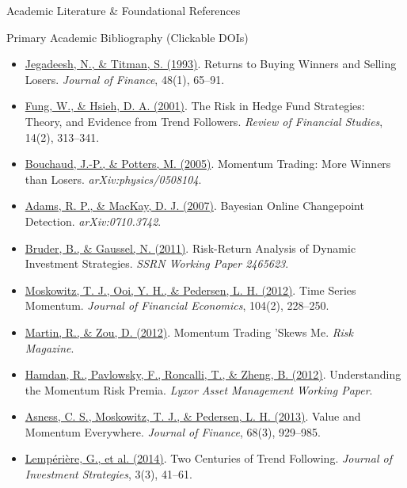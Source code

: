 \documentclass[10pt]{beamer}
\begin{document}
\begin{frame}{Academic Literature \& Foundational References}
  \begin{block}{\tiny Primary Academic Bibliography (Clickable DOIs)}
    \begin{itemize}\tiny
      \item \href{https://doi.org/10.1111/j.1540-6261.1993.tb04702.x}{Jegadeesh, N., \& Titman, S. (1993)}. Returns to Buying Winners and Selling Losers. \emph{Journal of Finance}, 48(1), 65--91.
      \item \href{https://people.duke.edu/~dah7/RFS2001.pdf}{Fung, W., \& Hsieh, D. A. (2001)}. The Risk in Hedge Fund Strategies: Theory, and Evidence from Trend Followers. \emph{Review of Financial Studies}, 14(2), 313--341.
      \item \href{https://arxiv.org/abs/physics/0508104}{Bouchaud, J.-P., \& Potters, M. (2005)}. Momentum Trading: More Winners than Losers. \emph{arXiv:physics/0508104}.
      \item \href{https://arxiv.org/abs/0710.3742}{Adams, R. P., \& MacKay, D. J. (2007)}. Bayesian Online Changepoint Detection. \emph{arXiv:0710.3742}.
      \item \href{https://ssrn.com/abstract=2465623}{Bruder, B., \& Gaussel, N. (2011)}. Risk-Return Analysis of Dynamic Investment Strategies. \emph{SSRN Working Paper 2465623}.
      \item \href{https://doi.org/10.1016/j.jfineco.2011.11.003}{Moskowitz, T. J., Ooi, Y. H., \& Pedersen, L. H. (2012)}. Time Series Momentum. \emph{Journal of Financial Economics}, 104(2), 228--250.
      \item \href{https://www.risk.net/derivatives/structured-products/2194247/momentum-trading-skews-me}{Martin, R., \& Zou, D. (2012)}. Momentum Trading 'Skews Me. \emph{Risk Magazine}.
      \item \href{http://www.thierry-roncalli.com/download/Alternative_Risk_Premia.pdf}{Hamdan, R., Pavlowsky, F., Roncalli, T., \& Zheng, B. (2012)}. Understanding the Momentum Risk Premia. \emph{Lyxor Asset Management Working Paper}.
      \item \href{https://doi.org/10.1111/jofi.12021}{Asness, C. S., Moskowitz, T. J., \& Pedersen, L. H. (2013)}. Value and Momentum Everywhere. \emph{Journal of Finance}, 68(3), 929--985.
      \item \href{https://arxiv.org/abs/1404.7797}{Lemp{\'e}ri{\`e}re, G., et al. (2014)}. Two Centuries of Trend Following. \emph{Journal of Investment Strategies}, 3(3), 41--61.

\end{itemize}
\end{block}
\end{frame}
\end{document}

